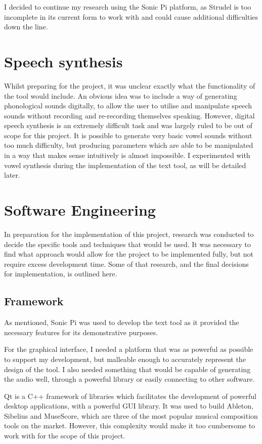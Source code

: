 \documentclass[12pt,a4paper,twoside,openright]{report}
\begin{document}
I decided to continue my research using the Sonic Pi platform, as Strudel is too incomplete in its current form to work with and could cause additional difficulties down the line.

\section{Speech synthesis}
Whilst preparing for the project, it was unclear exactly what the functionality of the tool would include. An obvious idea was to include a way of generating phonological sounds digitally, to allow the user to utilise and manipulate speech sounds without recording and re-recording themselves speaking. However, digital speech synthesis is an extremely difficult task and was largely ruled to be out of scope for this project. It is possible to generate very basic vowel sounds without too much difficulty, but producing parameters which are able to be manipulated in a way that makes sense intuitively is almost impossible. I experimented with vowel synthesis during the implementation of the text tool, as will be detailed later.

\section{Software Engineering}
In preparation for the implementation of this project, research was conducted to decide the specific tools and techniques that would be used. It was necessary to find what approach would allow for the project to be implemented fully, but not require excess development time. Some of that research, and the final decisions for implementation, is outlined here.

\subsection{Framework}
As mentioned, Sonic Pi was used to develop the text tool as it provided the necessary features for its demonstrative purposes.

For the graphical interface, I needed a platform that was as powerful as possible to support my development, but malleable enough to accurately represent the design of the tool. I also needed something that would be capable of generating the audio well, through a powerful library or easily connecting to other software.

Qt is a C++ framework of libraries which facilitates the development of powerful desktop applications, with a powerful GUI library. It was used to build Ableton, Sibelius and MuseScore, which are three of the most popular musical composition tools on the market. However, this complexity would make it too cumbersome to work with for the scope of this project.
\end{document}
